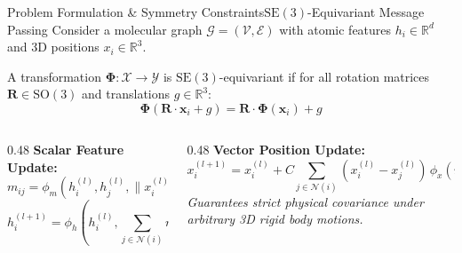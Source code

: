 \documentclass[10pt,aspectratio=169]{beamer}
\begin{document}
\begin{frame}{Problem Formulation \& Symmetry Constraints}{$\mathrm{SE}(3)$-Equivariant Message Passing}
  \small
  Consider a molecular graph $\mathcal{G} = (\mathcal{V}, \mathcal{E})$ with atomic features $h_i \in \mathbb{R}^d$ and 3D positions $x_i \in \mathbb{R}^3$.

  \begin{tcolorbox}[defensebox,title={\faCalculator \quad Equivariance Definition}]
    \small
    A transformation $\mathbf{\Phi}: \mathcal{X} \rightarrow \mathcal{Y}$ is $\mathrm{SE}(3)$-equivariant if for all rotation matrices $\mathbf{R} \in \mathrm{SO}(3)$ and translations $g \in \mathbb{R}^3$:
    \[
      \mathbf{\Phi}(\mathbf{R} \cdot \mathbf{x}_i + g) = \mathbf{R} \cdot \mathbf{\Phi}(\mathbf{x}_i) + g
    \]
  \end{tcolorbox}

  \vspace{2pt}
  \begin{columns}[T]
    \begin{column}{0.48\textwidth}
      \textbf{Scalar Feature Update:}
      \tiny
      \[
        m_{ij} = \phi_m \left( h_i^{(l)}, h_j^{(l)}, \|x_i^{(l)} - x_j^{(l)}\|^2, e_{ij} \right)
      \]
      \[
        h_i^{(l+1)} = \phi_h \left( h_i^{(l)}, \sum_{j \in \mathcal{N}(i)} m_{ij} \right)
      \]
    \end{column}
    \begin{column}{0.48\textwidth}
      \textbf{Vector Position Update:}
      \tiny
      \[
        x_i^{(l+1)} = x_i^{(l)} + C \sum_{j \in \mathcal{N}(i)} (x_i^{(l)} - x_j^{(l)}) \, \phi_x (m_{ij})
      \]
      \textit{Guarantees strict physical covariance under arbitrary 3D rigid body motions.}
    \end{column}
  \end{columns}
\end{frame}
\end{document}
